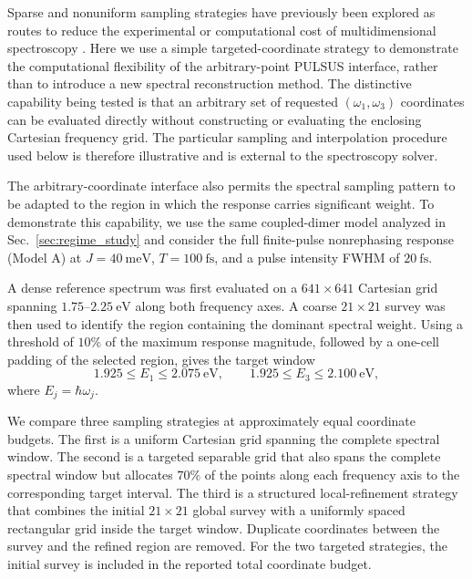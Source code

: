 Sparse and nonuniform sampling strategies have previously been explored
as routes to reduce the experimental or computational cost of
multidimensional spectroscopy
\cite{Almeida2012CompressedSampling,Roeding2017SparseSampling}.
Here we use a simple targeted-coordinate strategy to demonstrate the
computational flexibility of the arbitrary-point PULSUS interface,
rather than to introduce a new spectral reconstruction method. The
distinctive capability being tested is that an arbitrary set of requested
$(\omega_1,\omega_3)$ coordinates can be evaluated directly without
constructing or evaluating the enclosing Cartesian frequency grid. The
particular sampling and interpolation procedure used below is therefore
illustrative and is external to the spectroscopy solver.

The arbitrary-coordinate interface also permits the spectral sampling
pattern to be adapted to the region in which the response carries
significant weight.
To demonstrate this capability, we use the same coupled-dimer model
analyzed in Sec.~\ref{sec:regime_study} and consider the full
finite-pulse nonrephasing response (Model A) at
$J=40~\mathrm{meV}$, $T=100~\mathrm{fs}$, and a pulse intensity
FWHM of $20~\mathrm{fs}$.

A dense reference spectrum was first evaluated on a
$641\times641$ Cartesian grid spanning
$1.75$--$2.25~\mathrm{eV}$ along both frequency axes.
A coarse $21\times21$ survey was then used to identify the region
containing the dominant spectral weight.
Using a threshold of $10\%$ of the maximum response magnitude,
followed by a one-cell padding of the selected region, gives the target
window
%
\begin{equation}
1.925 \le E_1 \le 2.075~\mathrm{eV},
\qquad
1.925 \le E_3 \le 2.100~\mathrm{eV},
\label{eq:sampling_target_window}
\end{equation}
%
where $E_j=\hbar\omega_j$.

We compare three sampling strategies at approximately equal coordinate
budgets. The first is a uniform Cartesian grid spanning the complete
spectral window. The second is a targeted separable grid that also
spans the complete spectral window but allocates $70\%$ of the points
along each frequency axis to the corresponding target interval. The
third is a structured local-refinement strategy that combines the
initial $21\times21$ global survey with a uniformly spaced rectangular
grid inside the target window. Duplicate coordinates between the survey
and the refined region are removed. For the two targeted strategies,
the initial survey is included in the reported total coordinate budget.

